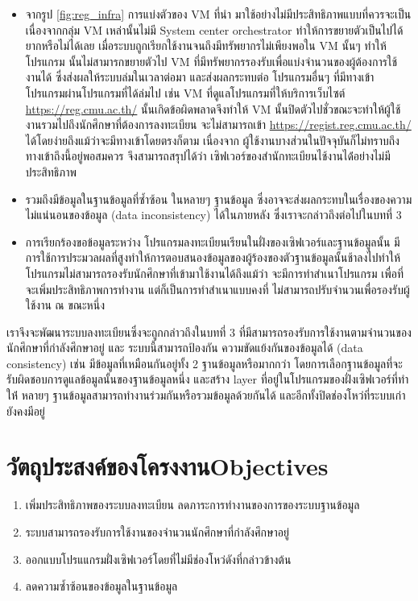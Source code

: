 \begin{itemize}
\item จากรูป \ref{fig:reg_infra} การแบ่งตัวของ VM \cite{vm} ที่นำ มาใช้อย่างไม่มีประสิทธิภาพแบบที่ควรจะเป็น
เนื่องจากกลุ่ม VM เหล่านั้นไม่มี System center orchestrator \cite{sco} ทำให้การขยายตัวเป็นไปได้ยากหรือไม่ได้เลย เมื่อระบบถูกเรียกใช้งานจนถึงมีทรัพยากรไม่เพียงพอใน VM นั้นๆ ทำให้โปรแกรม นั้นไม่สามารกขยายตัวไป VM ที่มีทรัพยากรรองรับเพื่อแบ่งจำนวนของผู้ต้องการใช้งานได้ ซึ่งส่งผลให้ระบบล่มในเวลาต่อมา และส่งผลกระทบต่อ โปรแกรมอื่นๆ 
ที่มีทางเข้าโปรแกรมผ่านโปรแกรมที่ได้ล่มไป เช่น VM ที่ดูแลโปรแกรมที่ให้บริการเว็บไซต์ \url{https://reg.cmu.ac.th/} นั้นเกิดข้อผิดพลาดจึงทำให้ VM นั้นปิดตัวไปชั่วขณะจะทำให้ผู้ใช้งานรวมไปถึงนักศึกษาที่ต้องการลงทะเบียน จะไม่สามารถเข้า \url{https://regist.reg.cmu.ac.th/} ได้โดยง่ายถึงแม้ว่าจะมีทางเข้าโดยตรงก็ตาม เนื่องจาก ผู้ใช้งานบางส่วนในปัจจุบันก็ไม่ทราบถึงทางเข้าถึงนี้อยู่พอสมควร จึงสามารถสรุปได้ว่า เซิฟเวอร์ของสำนักทะเบียนไช้งานได้่อย่างไม่มีประสิทธิภาพ

\item รวมถึงมีข้อมูลในฐานข้อมูลที่ซ้ำซ้อน ในหลายๆ ฐานข้อมูล ซึ่งอาจจะส่งผลกระทบในเรื่องของความไม่แน่นอนของข้อมูล (data inconsistency) ได้ในภายหลัง ซึ่งเราจะกล่าวถึงต่อไปในบทที่ 3

\item การเรียกร้องขอข้อมูลระหว่าง โปรแกรมลงทะเบียนเรียนในฝั่งของเซิฟเวอร์และฐานข้อมูลนั้น มีการใช้การประมวลผลที่สูงทำให้การตอบสนองข้อมูลของผู้ร้องของตัวฐานข้อมูลนั้นช้าลงไปทำให้ โปรแกรมไม่สามารถรองรับนักศึกษาที่เข้ามาใช้งานได้ถึงแม้ว่า จะมีการทำสำเนาโปรแกรม เพื่อที่จะเพิ่มประสิทธิภาพการทำงาน แต่ก็เป็นการทำสำเนาแบบคงที่ ไม่สามารถปรับจำนวนเพื่อรองรับผู้ใช้งาน ณ ขณะหนึ่ง
\end{itemize}

เราจึงจะพัฒนาระบบลงทะเบียนซึ่งจะถูกกล่าวถึงในบทที่ 3 ที่มีสามารถรองรับการใช้งานตามจำนวนของนักศึกษาที่กำลังศึกษาอยู่ และ ระบบนี้สามารถป้องกัน ความขัดแย้งกันของข้อมูลได้ (data consistency) เช่น มีข้อมูลที่เหมือนกันอยู่ทั้ง 2 ฐานข้อมูลหรือมากกว่า โดยการเลือกฐานข้อมูลที่จะรับผิดชอบการดูแลข้อมูลนั้นของฐานข้อมูลหนึ่ง และสร้าง layer ที่อยู่ในโปรแกรมของฝั่งเซิฟเวอร์ที่ทำให่้ หลายๆ ฐานข้อมูลสามารถทำงานร่วมกันหรือรวมข้อมูลด้วยกันได้ และอีกทั้งปิดช่องโหว่ที่ระบบเก่ายังคงมีอยู่

\section{\ifcpe วัตถุประสงค์ของโครงงาน\else Objectives\fi}
\begin{enumerate}
    \item เพิ่มประสิทธิภาพของระบบลงทะเบียน ลดภาระการทำงานของการของระบบฐานข้อมูล
    \item ระบบสามารถรองรับการใช้งานของจำนวนนักศึกษาที่กำลังศึกษาอยู่
    \item ออกแบบโปรแแกรมฝั่งเซิฟเวอร์โดยที่ไม่มีช่องโหว่ดังที่กล่าวข้างต้น
    \item ลดความซ้ำซ้อนของข้อมูลในฐานข้อมูล
\end{enumerate}

